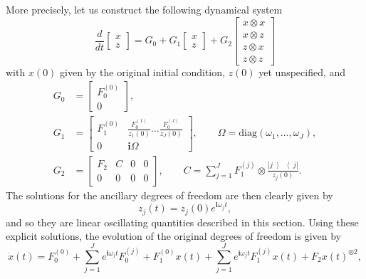 \documentclass[superscriptaddress,onecolumn,nofootinbib,longbibliography,a4paper,accepted=2026-09-29]{quantumarticle}
\theoremstyle{plain}
\theoremstyle{definition}
\numberwithin{thm}{section}
\numberwithin{assumption}{section}
\numberwithin{lemma}{section}
\numberwithin{prop}{section}
\numberwithin{cor}{section}
\numberwithin{definition}{section}
\numberwithin{rmk}{section}
\numberwithin{equation}{section}
\newcommand{\ketbra}[2]   {\left|#1\middle\rangle\!\middle\langle#2\right|}
\newcommand{\ot}{\otimes}
\renewcommand{\i}{\ensuremath{\mathbf{i}}}
\begin{document}
More precisely, let us construct the following dynamical system
\begin{equation}
    \frac{d}{dt} \begin{bmatrix}
        x\\
        z
    \end{bmatrix} 
    = 
    G_0 +
    G_1 \begin{bmatrix}
        x\\
        z
    \end{bmatrix}
    +
    G_2
    \begin{bmatrix}
        x\ot x\\
        x\ot z\\
        z \ot x\\
        z \ot z
    \end{bmatrix}
\end{equation}
with $x(0)$ given by the original initial condition, $z(0)$ yet unspecified, and
\begin{subequations}
    \begin{align}
        G_0 &= 
        \begin{bmatrix}
            F_0^{(0)}\\
            0
        \end{bmatrix},\\
        G_1 &= 
        \begin{bmatrix}
            F_1^{(0)} & \frac{F_0^{(1)}}{z_1(0)} \dots \frac{F_0^{(J)}}{z_J(0)} \\
            0 & \i\Omega 
        \end{bmatrix},
        \qquad
        \Omega = \mathrm{diag}(\omega_1,\dots,\omega_J),\\
        G_2 &= 
        \begin{bmatrix}
            F_2 & C & 0 & 0 \\
            0 & 0 &0 & 0
        \end{bmatrix},
        \qquad
        C =  \sum_{j=1}^{J} F_1^{(j)}\ot\frac{\ketbra{j}{j}}{z_j(0)}.
    \end{align}
\end{subequations}
The solutions for the ancillary degrees of freedom are then clearly given by
\begin{equation}
    z_j(t) = z_j(0) e^{\i \omega_j t},
\end{equation}
and so they are linear oscillating quantities described in this section. Using these explicit solutions, the evolution of the original degrees of freedom is given by
\begin{equation}
    \dot{x}(t) = F_0^{(0)} + \sum_{j=1}^{J} e^{\i \omega_j t} F_0^{(j)}  + F_1^{(0)} x(t) + \sum_{j=1}^{J}  e^{\i \omega_j t} F_1^{(j)} x(t) + F_2 x(t)^{\ot 2},
\end{equation}
\end{document}
